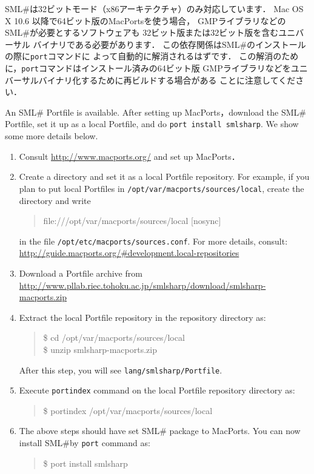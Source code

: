 \documentclass{jbook}
\newcommand{\smlsharp}{SML\#}
\newenvironment{program}{\begin{tt}\begin{quote}}{\end{quote}\end{tt}}
\begin{document}
	\smlsharp{}は32ビットモード（x86アーキテクチャ）のみ対応しています．
	Mac OS X 10.6 以降で64ビット版のMacPortsを使う場合，
GMPライブラリなどの\smlsharp{}が必要とするソフトウェアも
32ビット版または32ビット版を含むユニバーサル
バイナリである必要があります．
	この依存関係は\smlsharp{}のインストールの際に{\tt port}コマンドに
よって自動的に解消されるはずです．
	この解消のために，{\tt port}コマンドはインストール済みの64ビット版
GMPライブラリなどをユニバーサルバイナリ化するために再ビルドする場合がある
ことに注意してください．

\else%

	An \smlsharp{} Portfile is available.
	After setting up MacPorts，download the \smlsharp{} Portfile,
set it up as a local Portfile, and do {\tt port install smlsharp}.
	We show some more details below.

\begin{enumerate}
\item 
Consult \url{http://www.macports.org/} and set up MacPorts．

\item 
	Create a directory and set it as a local Portfile repository.
	For example, if you plan to put local Portfiles in
 {\tt /opt/var/macports/sources/local}, create the directory
and write
\begin{program}
file:///opt/var/macports/sources/local [nosync]
\end{program}
in the file {\tt /opt/etc/macports/sources.conf}.
	For more details, consult:
\url{http://guide.macports.org/#development.local-repositories}

\item 
	Download a Portfile archive from
\url{http://www.pllab.riec.tohoku.ac.jp/smlsharp/download/smlsharp-macports.zip}

\item 
	Extract the local Portfile repository in the repository
directory as:
\begin{program}
\$ cd /opt/var/macports/sources/local\\
\$ unzip smlsharp-macports.zip
\end{program}
	After this step, you will see {\tt lang/smlsharp/Portfile}.
\item
	 Execute {\tt portindex} command on the local Portfile
repository directory as:
\begin{program}
\$ portindex /opt/var/macports/sources/local
\end{program}

\item 
	The above steps should have set \smlsharp{} package to MacPorts.
	You can now install \smlsharp by {\tt port} command as:
\begin{program}
\$ port install smlsharp
\end{program}
\end{enumerate}
\end{document}
